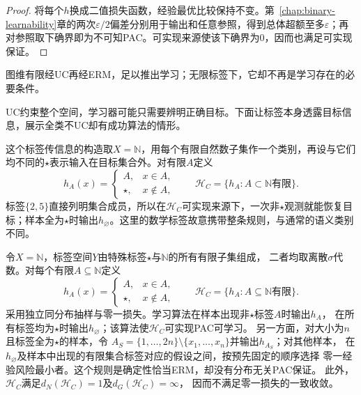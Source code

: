 \begin{proof}
将每个$h$换成二值损失函数，经验最优比较保持不变。第~\ref{chap:binary-learnability}章的两次$\varepsilon/2$偏差分别用于输出和任意参照，得到总体超额至多$\varepsilon$；再对参照取下确界即为不可知PAC。可实现来源使该下确界为0，因而也满足可实现保证。
\end{proof}

图维有限经UC再经ERM，足以推出学习；无限标签下，它却不再是学习存在的必要条件。

UC约束整个空间，学习器可能只需要辨明正确目标。下面让标签本身透露目标信息，展示全类不UC却有成功算法的情形。

这个标签传信息的构造取$X=\mathbb N$，用每个有限自然数子集作一个类别，再设与它们均不同的$\star$表示输入在目标集合外。对有限$A$定义
\begin{equation}
 h_A(x)=\begin{cases}A,&x\in A,\\\star,&x\notin A,\end{cases}
 \qquad\mathcal H_C=\{h_A:A\subset\mathbb N\text{有限}\}.
 \label{eq:cantor-class}
\end{equation}
标签$\{2,5\}$直接列明集合成员，所以在$\mathcal H_C$可实现来源下，一次非$\star$观测就能恢复目标；样本全为$\star$时输出$h_{\varnothing}$。这里的数学标签故意携带整条规则，与通常的语义类别不同。

\begin{theorem}[可学习性不推出一致收敛]
\label{thm:multiclass-erm-separation}
令$X=\mathbb N$，标签空间$Y$由特殊标签$\star$与$\mathbb N$的所有有限子集组成，
二者均取离散$\sigma$代数。对每个有限$A\subseteq\mathbb N$定义
\[
 h_A(x)=\begin{cases}A,&x\in A,\\\star,&x\notin A,\end{cases}
 \qquad
 \mathcal H_C=\{h_A:A\subseteq\mathbb N\text{有限}\}.
\]
采用独立同分布抽样与零一损失。学习算法在样本出现非$\star$标签$A$时输出$h_A$，
在所有标签均为$\star$时输出$h_{\varnothing}$；该算法使$\mathcal H_C$可实现PAC可学习。
另一方面，对大小为$n$且标签全为$\star$的样本，令
$A_S=\{1,\ldots,2n\}\setminus\{x_1,\ldots,x_n\}$并输出$h_{A_S}$；对其他样本，
在$h_{\varnothing}$及样本中出现的有限集合标签对应的假设之间，按预先固定的顺序选择
零一经验风险最小者。这个规则是确定性恰当ERM，却没有分布无关PAC保证。
此外，$\mathcal H_C$满足$d_N(\mathcal H_C)=1$及$d_G(\mathcal H_C)=\infty$，
因而不满足零一损失的一致收敛。
\end{theorem}

